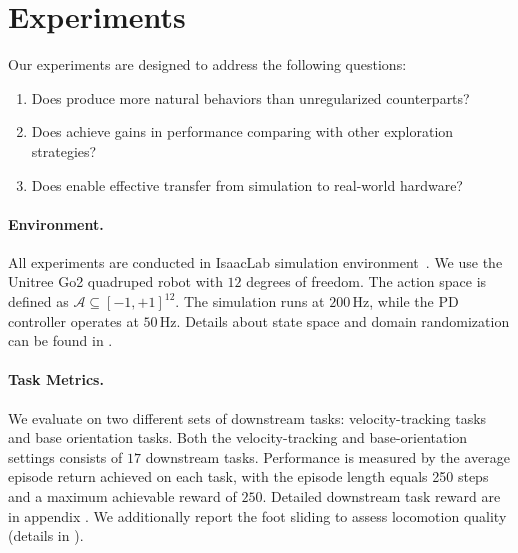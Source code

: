 \section{Experiments}
Our experiments are designed to address the following questions:
\begin{enumerate}
    \renewcommand{\labelenumi}{\roman{enumi})}
    \item Does \method produce more natural behaviors than unregularized counterparts?
    \item Does \method achieve gains in performance comparing with other exploration strategies? %
    \item Does \method enable effective transfer from simulation to real-world hardware?
\end{enumerate}
\paragraph{Environment.} All experiments are conducted in IsaacLab simulation environment~\citep{mittal2025isaaclab}. We use the Unitree Go2 quadruped robot with $12$ degrees of freedom. The action space is defined as $\mathcal{A} \subseteq [-1, +1]^{12}$. The simulation runs at $200$\,Hz, while the PD controller operates at $50$\,Hz. Details about state space and domain randomization can be found in .

\paragraph{Task Metrics.}
We evaluate \method on two different sets of downstream tasks: velocity-tracking tasks and base orientation tasks. Both the velocity-tracking and base-orientation settings consists of $17$ downstream tasks. Performance is measured by the average episode return achieved on each task, with the episode length equals 250 steps and a maximum achievable reward of $250$. Detailed downstream task reward are in appendix . We additionally report the foot sliding to assess locomotion quality (details in ).

